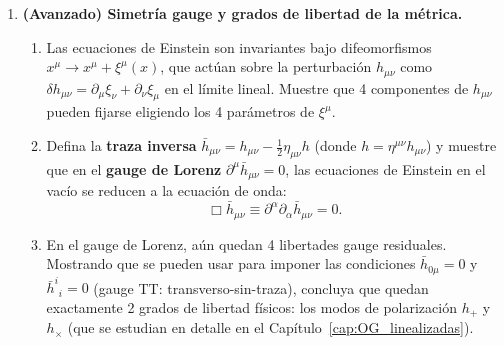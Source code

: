 \begin{enumerate}[leftmargin=2em, label=\textbf{P\thechapter.\arabic*.}]
  \item \textbf{(Avanzado) Simetría gauge y grados de libertad de la métrica.}
  \begin{enumerate}[label=(\alph*)]
    \item Las ecuaciones de Einstein son invariantes bajo difeomorfismos $x^\mu \to x^\mu + \xi^\mu(x)$, que actúan sobre la perturbación $h_{\mu\nu}$ como $\delta h_{\mu\nu} = \partial_\mu\xi_\nu + \partial_\nu\xi_\mu$ en el límite lineal. Muestre que 4 componentes de $h_{\mu\nu}$ pueden fijarse eligiendo los 4 parámetros de $\xi^\mu$.
    \item Defina la \textbf{traza inversa} $\bar{h}_{\mu\nu} = h_{\mu\nu} - \frac{1}{2}\eta_{\mu\nu}h$ (donde $h = \eta^{\mu\nu}h_{\mu\nu}$) y muestre que en el \textbf{gauge de Lorenz} $\partial^\mu\bar{h}_{\mu\nu} = 0$, las ecuaciones de Einstein en el vacío se reducen a la ecuación de onda:
    \begin{equation}
      \Box\bar{h}_{\mu\nu} \equiv \partial^\alpha\partial_\alpha\bar{h}_{\mu\nu} = 0.
    \end{equation}
    \item En el gauge de Lorenz, aún quedan 4 libertades gauge residuales. Mostrando que se pueden usar para imponer las condiciones $\bar{h}_{0\mu} = 0$ y $\bar{h}^i{}_i = 0$ (gauge TT: transverso-sin-traza), concluya que quedan exactamente 2 grados de libertad físicos: los modos de polarización $h_+$ y $h_\times$ (que se estudian en detalle en el Capítulo~\ref{cap:OG_linealizadas}).
  \end{enumerate}

\end{enumerate}
